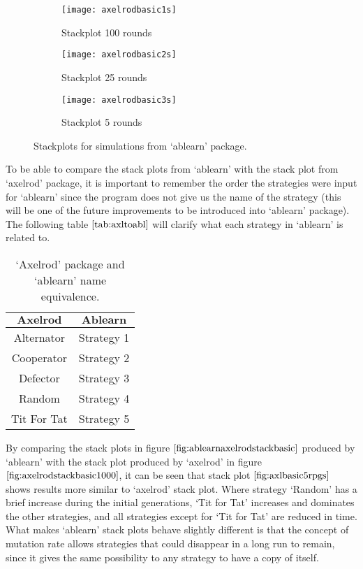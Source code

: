 \begin{figure}[H]       
    \centering
    \begin{subfigure}[b]{0.4\textwidth}
	\centering
	{\texttt{[image: axelrodbasic1s]}}   
    	\caption{Stackplot 100 rounds}
	\label{fig:axlbasic100rpgs}
    \end{subfigure}
    \hfill
    \begin{subfigure}[b]{0.4\textwidth}
	\centering
	{\texttt{[image: axelrodbasic2s]}}   
    	\caption{Stackplot 25 rounds}
	\label{fig:axlbasic25rpgs}
    \end{subfigure}
    \hfill
    \begin{subfigure}[b]{0.4\textwidth}
	\centering
	{\texttt{[image: axelrodbasic3s]}}   
    	\caption{Stackplot 5 rounds}
	\label{fig:axlbasic5rpgs}
    \end{subfigure}
    \caption{Stackplots for simulations from `ablearn' package.}
    \label{fig:ablearnaxelrodstackbasic}
\end{figure}

To be able to compare the stack plots from `ablearn' with the stack plot from `axelrod' package, it is important to remember the order the strategies were input for `ablearn' since the program does not give us the name of the strategy (this will be one of the future improvements to be introduced into `ablearn' package). The following table $\ref{tab:axltoabl}$ will clarify what each strategy in `ablearn' is related to.

\begin{table}[H]
\begin{center}
\begin{tabular}{|c|c|}
\hline
$\textbf{Axelrod}$& $\textbf{Ablearn}$\\ 
\hline
Alternator & Strategy 1\\
\hline
Cooperator & Strategy 2 \\
\hline
Defector & Strategy 3\\
\hline
Random & Strategy 4\\
\hline
Tit For Tat & Strategy 5\\
\hline
\end{tabular}
\end{center}
\caption{`Axelrod' package and `ablearn' name equivalence.}
\label{tab:axltoabl}
\end{table}

By comparing the stack plots in figure $\ref{fig:ablearnaxelrodstackbasic}$ produced by `ablearn' with the stack plot produced by `axelrod' in figure $\ref{fig:axelrodstackbasic1000}$, it can be seen that stack plot $\ref{fig:axlbasic5rpgs}$ shows results more similar to `axelrod' stack plot. Where strategy `Random' has a brief increase during the initial generations, `Tit for Tat' increases and dominates the other strategies, and all strategies except for `Tit for Tat' are reduced in time. What makes `ablearn' stack plots behave slightly different is that the concept of mutation rate allows strategies that could disappear in a long run to remain, since it gives the same possibility to any strategy to have a copy of itself. 

